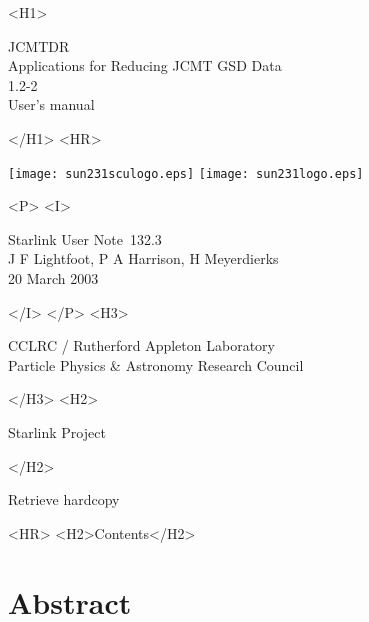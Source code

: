 \documentclass[twoside,11pt]{article}
\newcommand{\stardoccategory}  {Starlink User Note}
\newcommand{\stardocsource}    {sun\stardocnumber}
\newcommand{\stardocnumber}    {132.3}
\newcommand{\stardocauthors}
   {J F Lightfoot, P A Harrison, H Meyerdierks}
\newcommand{\stardocdate}      {20 March 2003}
\newcommand{\stardoctitle}     {JCMTDR \\[2ex] Applications for Reducing JCMT GSD Data}
\newcommand{\stardocversion}   {1.2-2}
\newcommand{\stardocmanual}    {User's manual}
\newcommand{\htmladdnormallink}[2]{#1}
\newcommand{\htmladdimg}[1]{}
\newcommand{\htmlref}[2]{#1}
\newcommand{\htmladdtonavigation}[1]{}
\newcommand{\xlabel}[1]{}
\renewcommand{\_}{\texttt{\symbol{95}}}
\begin{document}
\begin{htmlonly}
   \xlabel{}
   \begin{rawhtml} <H1> \end{rawhtml}
      \stardoctitle\\
      \stardocversion\\
      \stardocmanual
   \begin{rawhtml} </H1> <HR> \end{rawhtml}

\texttt{[image: sun231\_sculogo.eps]}
\texttt{[image: sun231\_logo.eps]}

   \begin{rawhtml} <P> <I> \end{rawhtml}
   \stardoccategory\ \stardocnumber \\
   \stardocauthors \\
   \stardocdate
   \begin{rawhtml} </I> </P> <H3> \end{rawhtml}
      \htmladdnormallink{CCLRC / Rutherford Appleton Laboratory}
                        {http://www.cclrc.ac.uk} \\
      \htmladdnormallink{Particle Physics \& Astronomy Research Council}
                        {http://www.pparc.ac.uk} \\
   \begin{rawhtml} </H3> <H2> \end{rawhtml}
      \htmladdnormallink{Starlink Project}{http://www.starlink.ac.uk/}
   \begin{rawhtml} </H2> \end{rawhtml}
   \htmladdnormallink{\htmladdimg{source.gif} Retrieve hardcopy}
      {http://www.starlink.ac.uk/cgi-bin/hcserver?\stardocsource}\\

  \label{stardoccontents}
  \begin{rawhtml}
    <HR>
    <H2>Contents</H2>
  \end{rawhtml}
  \htmladdtonavigation{\htmlref{\htmladdimg{contents_motif.gif}}
        {stardoccontents}}

  \section{\xlabel{abstract}Abstract}
\end{htmlonly}
\end{document}
